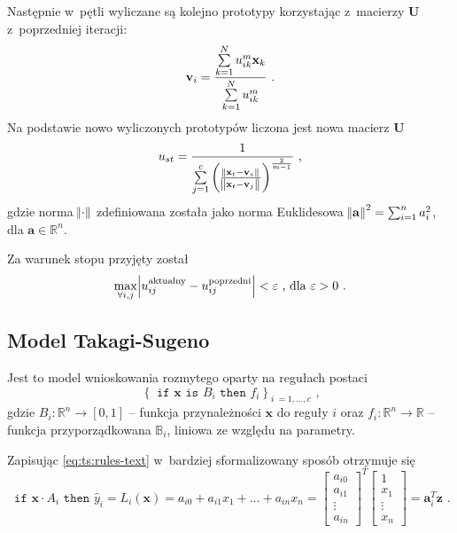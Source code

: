 \documentclass[a4paper; 11pt]{article}
\begin{document}
Następnie w~pętli wyliczane są kolejno prototypy korzystając z~macierzy
$\mathbf{U}$ z~poprzedniej iteracji:
\begin{equation}
    \mathbf{v}_i = \frac{
            \sum\limits_{k=1}^N {u_{ik}^m \mathbf{x}_k}
        }{%
            \sum\limits_{k=1}^N {u_{ik}^m}
        } \text{ .}
    \label{eq:fcm:V}
\end{equation}
Na podstawie nowo wyliczonych prototypów liczona jest nowa macierz $\mathbf{U}$
\begin{equation}
    u_{st} = \frac{1}{\sum\limits_{j=1}^c {
        \left( \frac{
            \norm{\mathbf{x}_t - \mathbf{v}_s}}{
            \norm{\mathbf{x}_t - \mathbf{v}_j}} \right)^{
                \frac{2}{m - 1}}}} \text{ ,}
    \label{eq:fcm:U}
\end{equation}
gdzie norma $\norm{\cdot}$ zdefiniowana została jako norma Euklidesowa
$\norm{\mathbf{a}}^2 = \sum_{i=1}^n {a_i^2}$, dla $\mathbf{a} \in \mathbb{R}^n$.

Za warunek stopu przyjęty został
\begin{equation}
    \max_{\forall{i,j}}{\abs{u_{ij}^\text{aktualny} - u_{ij}^\text{poprzedni}}} < \varepsilon 
    \text{ , dla } \varepsilon > 0 \text{ .}
    \label{eq:fcm:stop}
\end{equation}


\subsection{Model Takagi-Sugeno}

Jest to model wnioskowania rozmytego oparty na regułach postaci
\begin{equation}
    \left\{ \texttt{ if } \mathbf{x} \texttt{ is } B_i \texttt{ then } f_i \right\}_{i~= 1,\dots,c} \text{ ,}
    \label{eq:ts:rules-text}
\end{equation}
gdzie
$B_i : \mathbb{R}^n \rightarrow [0, 1]$ -- funkcja przynależności $\mathbf{x}$ do reguły $i$ oraz
$f_i : \mathbb{R}^n \rightarrow \mathbb{R}$ -- funkcja przyporządkowana 
    $\mathbb{B}_i$, liniowa ze względu na parametry.

Zapisując \eqref{eq:ts:rules-text} w~bardziej sformalizowany sposób otrzymuje się
\begin{equation}
    \texttt{ if } \mathbf{x} \cdot A_i \texttt{ then } \hat{y}_i = L_i(\mathbf{x}) = a_{i0} + a_{i1} x_1 + \dots + a_{in} x_n =
    \begin{bmatrix}
        a_{i0} \\ a_{i1} \\ \vdots \\ a_{in}
    \end{bmatrix}^T
    \begin{bmatrix}
        1 \\ x_1 \\ \vdots \\ x_n
    \end{bmatrix} = \mathbf{a}_i^T \mathbf{z} \text{ .}
    \label{eq:ts:rules}
\end{equation}
\end{document}
